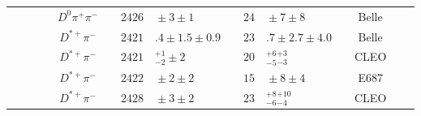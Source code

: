\begin{adjustbox}{width=0.76\textwidth,center}
{\begin{tabular}{cp{5pt}cp{5pt}cp{5pt}r@{}lp{5pt}r@{}lp{5pt}cp{5pt}c}
		                                         &                  &                              &                  & $D^{0}\pi^{+}\pi^{-}$           &                       & $	2426$                       & ${}\pm3 \pm1	$                                &                       & $	24$                                            & ${}\pm7\pm8	$                                &                       & Belle                                                         &                       & \cite{Abe:2004sm}                         \\
		                                         &                  &                              &                  & $D^{*+}\pi^{-}$                 &                       & $	2421$                       & $.4 \pm1.5 \pm 0.9	$                          &                       & $	23$                                            & $.7\pm2.7\pm4.0	$                            &                       & Belle                                                         &                       & \cite{Abe:2003zm}                         \\
		                                         &                  &                              &                  & $D^{*+}\pi^{-}$                 &                       & $	2421$                       & ${}^{+1}_{-2}\pm2	$                           &                       & $	20$                                            & ${}^{+6}_{-5}{}^{+3}_{-3}	$                  &                       & CLEO                                                          &                       & \cite{Avery:1994yc}                       \\
		                                         &                  &                              &                  & $D^{*+}\pi^{-}$                 &                       & $	2422$                       & ${} \pm2 \pm2	$                               &                       & $	15$                                            & ${}\pm8\pm4	$                                &                       & E687                                                          &                       & \cite{Frabetti:1993vv}                    \\
		                                         &                  &                              &                  & $D^{*+}\pi^{-}$                 &                       & $	2428$                       & ${}\pm3\pm2	$                                 &                       & $	23$                                            & ${}^{+8}_{-6}{}^{+10}_{-4}	$                 &                       & CLEO                                                          &                       & \cite{Avery:1989ui}                       \\

\end{tabular}}
\end{adjustbox}
